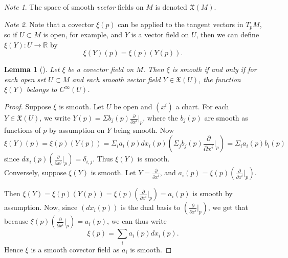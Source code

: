\documentclass[reqno]{amsart}
\newtheorem{lemma}[theorem]{Lemma}
\theoremstyle{definition}
\theoremstyle{remark}
\newtheorem*{note}{Note}
\begin{document}
      \begin{note}
          The space of smooth \textit{vector} fields
          on $M$ is denoted $\mathfrak{X}(M)$.
      \end{note}

      \begin{note}
          Note that a covector $\xi(p)$ can be applied to
          the tangent vectors in $T_pM$, so
          if $U \subset M$ is open, for example, and
          $Y$ is a vector field on $U$, then
          we can define
          $\xi (Y) \colon U \to \mathbb{R}$ by
          \[
          \xi(Y) (p) = \xi(p) \left( Y(p) \right) .
          \] 
      \end{note}

      \begin{lemma}[]
          Let $\xi$ be a covector field on $M$. Then
          $\xi$ is smooth if and only if
          for each open set $U \subset M$ and each smooth
          vector field $Y \in \mathfrak{X}(U)$, the
          function $\xi (Y)$ belongs to $C^{\infty}(U)$.
      \end{lemma}

      \begin{proof}
          Suppose
          $\xi$ is smooth. Let $U$ be open and
          $(x^{i})$ a chart. For each
          $Y \in \mathfrak{X}(U)$, we write
          $Y(p) = \Sigma b_j(p) \frac{\partial}{\partial x^{i}}|_{p}$,
          where the $b_j(p)$ are smooth as functions
          of $p$ by assumption on $Y$ being smooth.
          Now
          \[
          \xi(Y) (p) = 
          \xi(p) \left( Y(p) \right) 
          = \Sigma_i a_i(p) dx_i(p)
          \left( \Sigma_j b_j(p) \frac{\partial}{\partial x^{i}}
          |_{p} \right) =
          \Sigma_i a_i (p) b_i(p)
          \] 
          since
          $dx_i(p) \left( \frac{\partial }{\partial x^{j}}
          |_{p}\right) = \delta_{i,j}$. Thus
          $\xi(Y)$ is smooth.\\

          Conversely, suppose $\xi(Y)$ is smooth. Let
          $Y = \frac{\partial}{\partial x^{i}}$, and
          $a_i(p) = \xi(p) \left( 
          \frac{\partial}{\partial x^{i}}|_p \right) $.

          Then $\xi(Y) =
          \xi (p) \left( Y(p) \right) 
          = \xi(p) \left( \frac{\partial}{\partial x^{i}}|_p
          \right) =
          a_i(p)$ is smooth by assumption.
          Now, since
          $\left( dx_i(p) \right) $ is the dual basis
          to $\left( \frac{\partial}{\partial x^{i}}|_p \right) $,
          we get that because
          $\xi(p) \left( \frac{\partial }{\partial x^{i}}|_p
          \right) = a_i(p)$, we can thus write
          \[
          \xi(p) = \sum_{i} a_i(p) dx_i(p).
          \] 
          Hence $\xi$ is a smooth covector field as
          $a_i$ is smooth.
      \end{proof}
\end{document}
